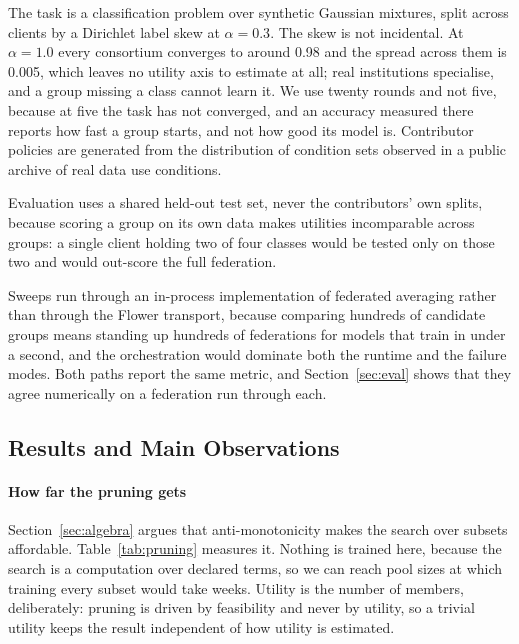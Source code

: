 \documentclass[10pt,conference]{IEEEtran}
\begin{document}
The task is a classification problem over synthetic Gaussian mixtures, split
across clients by a Dirichlet label skew at $\alpha = 0.3$. The skew is not
incidental. At $\alpha = 1.0$ every consortium converges to around 0.98 and the
spread across them is 0.005, which leaves no utility axis to estimate at all;
real institutions specialise, and a group missing a class cannot learn it.
We use twenty rounds and not five, because at five the task has not converged,
and an accuracy measured there reports how fast a group starts, and not how good its model is. Contributor policies are generated from the distribution of
condition sets observed in a public archive of real data use conditions.

Evaluation uses a shared held-out test set, never the contributors' own splits,
because scoring a group on its own data makes utilities incomparable across
groups: a single client holding two of four classes would be tested only on
those two and would out-score the full federation.

Sweeps run through an in-process implementation of federated averaging rather
than through the Flower transport, because comparing hundreds of candidate
groups means standing up hundreds of federations for models that train in under
a second, and the orchestration would dominate both the runtime and the failure
modes. Both paths report the same metric, and
Section~\ref{sec:eval} shows that they agree numerically on a federation run
through each.

\subsection{Results and Main Observations}

\paragraph{How far the pruning gets}
\label{sec:pruning}
Section~\ref{sec:algebra} argues that anti-monotonicity makes the search over
subsets affordable. Table~\ref{tab:pruning} measures it. Nothing is trained
here, because the search is a computation over declared terms, so we can reach
pool sizes at which training every subset would take weeks. Utility is the
number of members, deliberately: pruning is driven by feasibility and never by
utility, so a trivial utility keeps the result independent of how utility is
estimated.
\end{document}
